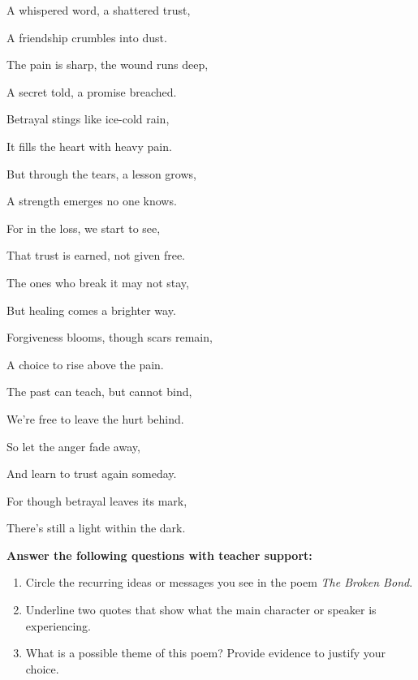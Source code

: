 \documentclass[12pt]{article}
\begin{document}
\begin{tcolorbox}[colframe=black!60, colback=white, 
coltitle=black, colbacktitle=black!15, fonttitle=\bfseries\Large, 
title=Text: \textit{The Broken Bond}, halign title=center, left=10pt, right=10pt, top=10pt, bottom=15pt]

A whispered word, a shattered trust,

A friendship crumbles into dust.

The pain is sharp, the wound runs deep,

A secret told, a promise breached.

Betrayal stings like ice-cold rain,

It fills the heart with heavy pain.

But through the tears, a lesson grows,

A strength emerges no one knows.

For in the loss, we start to see,

That trust is earned, not given free.

The ones who break it may not stay,

But healing comes a brighter way.

Forgiveness blooms, though scars remain,

A choice to rise above the pain.

The past can teach, but cannot bind,

We’re free to leave the hurt behind.

So let the anger fade away,

And learn to trust again someday.

For though betrayal leaves its mark,

There’s still a light within the dark.

 

 

\end{tcolorbox}

\vspace{1em}
\begin{tcolorbox}[colframe=black!60, colback=white, 
coltitle=black, colbacktitle=black!15, fonttitle=\bfseries\Large, 
title=Guided Practice, halign title=center, left=10pt, right=10pt, top=10pt, bottom=15pt]



\textbf{Answer the following questions with teacher support:}
\begin{enumerate}[itemsep=1em]
    \item Circle the recurring ideas or messages you see in the poem \textit{The Broken Bond}.
    \item Underline two quotes that show what the main character or speaker is experiencing.
    \item What is a possible theme of this poem? Provide evidence to justify your choice.
\vspace{7em}
\end{enumerate}
\end{tcolorbox}
\end{document}
